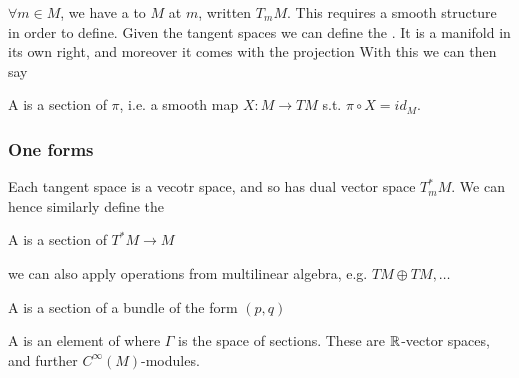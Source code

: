 \documentclass{article}
\begin{document}
$\forall m \in M$, we have a  to $M$ at $m$, written $T_m M$. This requires a smooth structure in order to define. Given the tangent spaces we can define 
the . It is a manifold in its own right, and moreover it comes with the projection 
With this we can then say
\begin{definition}
A  is a section of $\pi$, i.e. a smooth map $X:M \to TM$ s.t. $\pi \circ X = id_M$. 
\end{definition}


\subsubsection{One forms}
Each tangent space is a vecotr space, and so has dual vector space $T_m^\ast M$. We can hence similarly define the  

\begin{definition}
A  is a section of $T^\ast M \to M$
\end{definition}
we can also apply operations from multilinear algebra, e.g. $TM \oplus TM, \dots$

\begin{definition}
A  is a section of a bundle of the form $(p,q)$
\end{definition}

\begin{definition}
A  is an element of 
where $\Gamma$ is the space of sections. These are $\mathbb{R}$-vector spaces, and further $C^\infty(M)$-modules. 
\end{definition}

\end{document}
